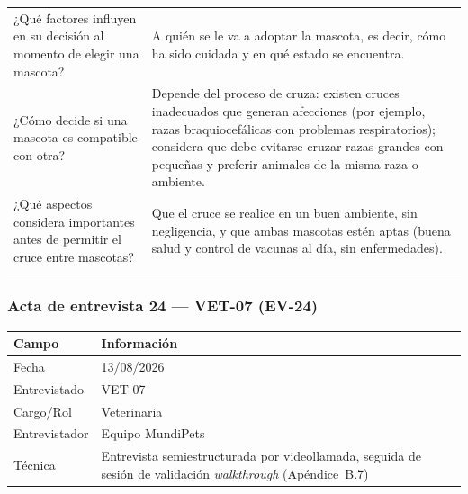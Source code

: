 \documentclass[journal,onecolumn]{IEEEtran}
\begin{document}
{\begin{longtable}{@{}p{5.6cm} p{9.4cm}@{}}
			¿Qué factores influyen en su decisión al momento de elegir una mascota? & A quién se le va a adoptar la mascota, es decir, cómo ha sido cuidada y en qué estado se encuentra. \\ \addlinespace
			
			¿Cómo decide si una mascota es compatible con otra? & Depende del proceso de cruza: existen cruces inadecuados que generan afecciones (por ejemplo, razas braquiocefálicas con problemas respiratorios); considera que debe evitarse cruzar razas grandes con pequeñas y preferir animales de la misma raza o ambiente. \\ \addlinespace
			
			¿Qué aspectos considera importantes antes de permitir el cruce entre mascotas? & Que el cruce se realice en un buen ambiente, sin negligencia, y que ambas mascotas estén aptas (buena salud y control de vacunas al día, sin enfermedades). \\ \addlinespace
			
		\end{longtable}
	}

	\subsubsection*{Acta de entrevista 24 --- VET-07 (EV-24)}

	\begin{table}[H]
		\centering\small
		\begin{tabularx}{\textwidth}{@{}l X@{}}
			\toprule
			\textbf{Campo} & \textbf{Información} \\
			\midrule
			
			Fecha & 13/08/2026 \\
			
			Entrevistado & VET-07 \\
			
			Cargo/Rol & Veterinaria \\
			
			Entrevistador & Equipo MundiPets \\
			
			Técnica & Entrevista semiestructurada por videollamada, seguida de sesión de validación \emph{walkthrough} (Apéndice~B.7) \\
			
			\bottomrule
		\end{tabularx}
	\end{table}
\end{document}
